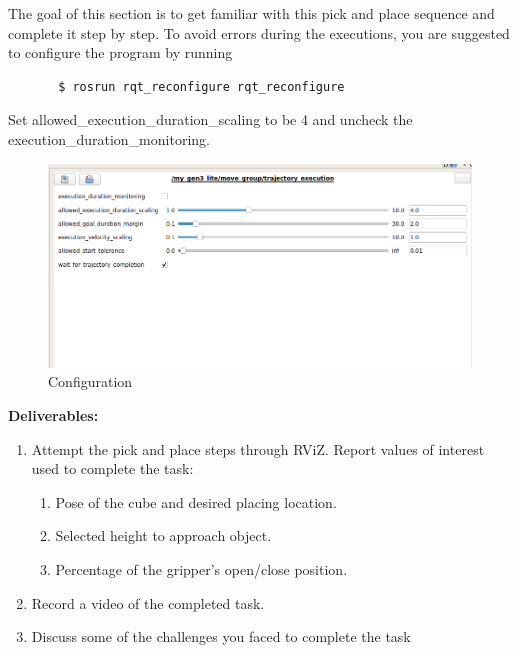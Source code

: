 \documentclass[12pt]{article}
\begin{document}
The goal of this section is to get familiar with this pick and place sequence and complete it step by step. To avoid errors during the executions, you are suggested to configure the program by running
\begin{verbatim}
       $ rosrun rqt_reconfigure rqt_reconfigure
    \end{verbatim}
Set allowed\_execution\_duration\_scaling to be 4 and uncheck the execution\_duration\_monitoring.
\begin{figure}[H]
    \vspace{-10pt}
    \centering\includegraphics[width=13cm]{images/config.png}\vspace{-10pt}
    \caption{Configuration}\label{fig:kinovarviz}
    \end{figure}


\textbf{Deliverables:}
\begin{enumerate}
    \item Attempt the pick and place steps through RViZ. Report values of interest used to complete the task:
    \begin{enumerate}
        \item Pose of the cube and desired placing location.
        \item Selected height to approach object.
        \item Percentage of the gripper’s open/close position.
    \end{enumerate}
    \item Record a video of the completed task.
    \item Discuss some of the challenges you faced to complete the task
\end{enumerate}
\end{document}
